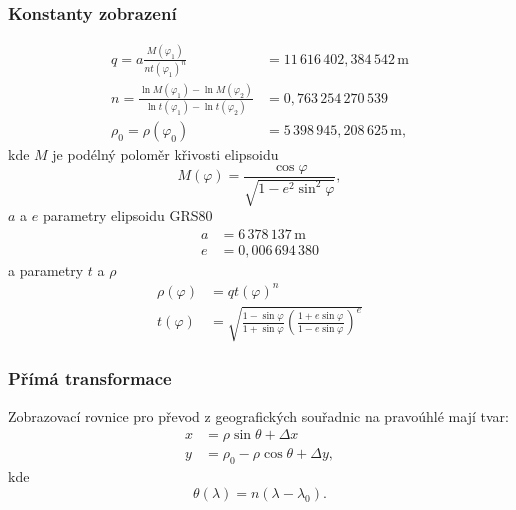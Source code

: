 \documentclass[a4paper]{article}
\begin{document}
\subsubsection{Konstanty zobrazení}
\begin{align*}
q = a \frac{M(\varphi_1)}{n t(\varphi_1)^n} &= 11\,616\,402,384\,542\,\mathrm{m}\\
n = \frac{\ln{M(\varphi_1)} - \ln{M(\varphi_2)}}{\ln{t(\varphi_1)} - \ln{t(\varphi_2)}} &= 0,763\,254\,270\,539\\
\rho_0 = \rho(\varphi_0) &= 5\,398\,945,208\,625\,\mathrm{m},
\end{align*}
kde $M$ je podélný poloměr křivosti elipsoidu
\begin{equation*}
M(\varphi) = \frac{\cos{\varphi}}{\sqrt{1 - e^2 \sin^2{\varphi}}},
\end{equation*}
$a$ a $e$ parametry elipsoidu GRS80
\begin{align*}
a &= 6\,378\,137\,\mathrm{m}\\
e &= 0,006\,694\,380
\end{align*}
a parametry $t$ a $\rho$
\begin{align*}
\rho(\varphi) &= q t(\varphi)^n\\
t(\varphi) &= \sqrt{\frac{1-\sin{\varphi}}{1+\sin{\varphi}}\left(\frac{1+e\sin{\varphi}}{1-e\sin{\varphi}}\right)^e}
\end{align*}

\subsubsection{Přímá transformace}
Zobrazovací rovnice pro převod z geografických souřadnic na pravoúhlé mají tvar:
\begin{align*}
x &= \rho \sin{\theta} + \Delta x\\
y &= \rho_0 - \rho \cos{\theta} + \Delta y,
\end{align*}
kde
\begin{equation*}
\theta(\lambda) = n (\lambda - \lambda_0).
\end{equation*}
  
\end{document}
